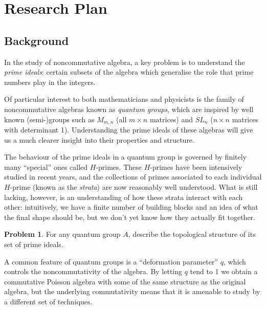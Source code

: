 \documentclass[11pt]{amsart}
\theoremstyle{definition}
\newtheorem{problem}{Problem}
\numberwithin{equation}{theorem}
\begin{document}
\section{Research Plan}
\subsection{Background} In the study of noncommutative algebra, a key problem is to understand the \textit{prime ideals}: certain subsets of the algebra which generalise the role that prime numbers play in the integers.  

Of particular interest to both mathematicians and physicists is the family of noncommutative algebras known as \textit{quantum groups}, which are inspired by well known (semi-)groups such as $M_{m,n}$ (all $m\times n$ matrices) and $SL_n$ ($n \times n$ matrices with determinant 1).  Understanding the prime ideals of these algebras will give us a much clearer insight into their properties and structure.  

The behaviour of the prime ideals in a quantum group is governed by finitely many ``special'' ones called $H$-primes.  These $H$-primes have been intensively studied in recent years, and the collections of primes associated to each individual $H$-prime (known as the \textit{strata}) are now reasonably well understood.  What is still lacking, however, is an understanding of how these strata interact with each other: intuitively, we have a finite number of building blocks and an idea of what the final shape should be, but we don't yet know how they actually fit together.


\begin{problem}\label{problem quantum structure}
For any quantum group $A$, describe the topological structure of its set of prime ideals.
\end{problem}

A common feature of quantum groups is a ``deformation parameter'' $q$, which controls the noncommutativity of the algebra.  By letting $q$ tend to 1 we obtain a commutative Poisson algebra with some of the same structure as the original algebra, but the underlying commutativity means that it is amenable to study by a different set of techniques. 
\end{document}
